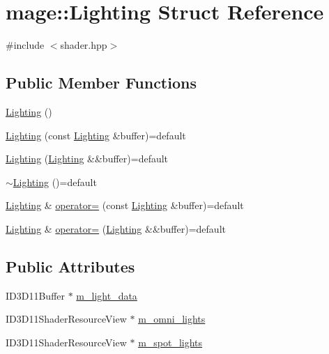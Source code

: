 \hypertarget{structmage_1_1_lighting}{}\section{mage\+:\+:Lighting Struct Reference}
\label{structmage_1_1_lighting}


{\ttfamily \#include $<$shader.\+hpp$>$}

\subsection*{Public Member Functions}
\begin{DoxyCompactItemize}
\item 
\hyperlink{structmage_1_1_lighting_ad20db5afa45811185e31388deeda624b}{Lighting} ()
\item 
\hyperlink{structmage_1_1_lighting_ae92175ad94cc88badf2dc4fd93cb2e2f}{Lighting} (const \hyperlink{structmage_1_1_lighting}{Lighting} \&buffer)=default
\item 
\hyperlink{structmage_1_1_lighting_a03ce177d02db1f7ee2b779aa4cb321c1}{Lighting} (\hyperlink{structmage_1_1_lighting}{Lighting} \&\&buffer)=default
\item 
\hyperlink{structmage_1_1_lighting_a2b357cb6853d05bae8be16fc6d63a6c3}{$\sim$\+Lighting} ()=default
\item 
\hyperlink{structmage_1_1_lighting}{Lighting} \& \hyperlink{structmage_1_1_lighting_af3407499990673e6a6880cbcc5f5b054}{operator=} (const \hyperlink{structmage_1_1_lighting}{Lighting} \&buffer)=default
\item 
\hyperlink{structmage_1_1_lighting}{Lighting} \& \hyperlink{structmage_1_1_lighting_adf7079d86353561a08e1729932d5e9e2}{operator=} (\hyperlink{structmage_1_1_lighting}{Lighting} \&\&buffer)=default
\end{DoxyCompactItemize}
\subsection*{Public Attributes}
\begin{DoxyCompactItemize}
\item 
I\+D3\+D11\+Buffer $\ast$ \hyperlink{structmage_1_1_lighting_a86b0b11255b340aefd2826e4ce20e62e}{m\+\_\+light\+\_\+data}
\item 
I\+D3\+D11\+Shader\+Resource\+View $\ast$ \hyperlink{structmage_1_1_lighting_ad116b6a834a38a114276da0c6fd5544c}{m\+\_\+omni\+\_\+lights}
\item 
I\+D3\+D11\+Shader\+Resource\+View $\ast$ \hyperlink{structmage_1_1_lighting_a6bb1975014038fd8205f25c48e8ed1e3}{m\+\_\+spot\+\_\+lights}
\end{DoxyCompactItemize}


